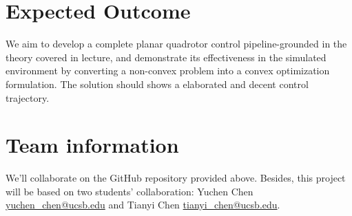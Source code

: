 \documentclass[conference]{IEEEtran}
\begin{document}
\section{\textbf{Expected Outcome}}
We aim to develop a complete planar quadrotor control pipeline-grounded in the theory covered in lecture, and demonstrate its effectiveness in the simulated environment by converting a non-convex problem into a convex optimization formulation. The solution should shows a elaborated and decent control trajectory.

\section{\textbf{Team information}}
We'll collaborate on the GitHub repository provided above.
Besides, this project will be based on two students' collaboration: Yuchen Chen \href{yuchen\_chen@ucsb.edu}{yuchen\_chen@ucsb.edu} and Tianyi Chen \href{tianyi\_chen@ucsb.edu}{tianyi\_chen@ucsb.edu}.

%




\end{document}

